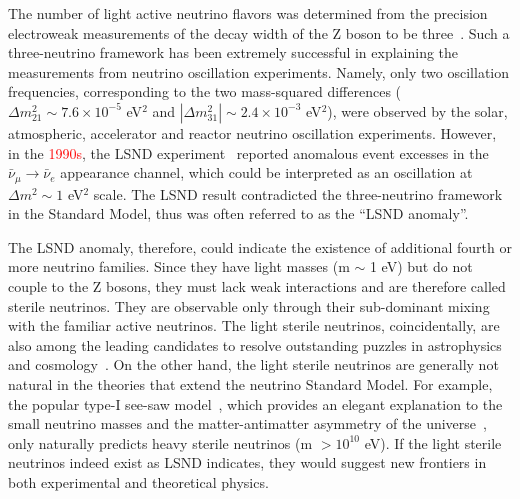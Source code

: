 \documentclass[aps,twocolumn,preprintnumbers,amsmath,superscriptaddress,amssymb,floats,nofootinbib]{revtex4-1}
\begin{document}
The number of light active neutrino flavors was determined from the precision electroweak measurements of the decay width of the Z boson to be three~\cite{EW-2005}. 
Such a three-neutrino framework has been extremely successful in explaining the measurements from neutrino oscillation experiments. 
Namely, only two oscillation frequencies, corresponding to the two mass-squared differences ($\Delta m_{21}^2\sim7.6\times10^{-5}$ eV$^2$ and $|\Delta m_{31}^2|\sim2.4\times10^{-3}$ eV$^2$), were observed by the solar, atmospheric, accelerator and reactor neutrino oscillation experiments. 
However, in the \textcolor{red}{1990s}, the LSND experiment~\cite{LSND1995,LSND2001} reported anomalous event excesses in the $\bar\nu_\mu\rightarrow\bar\nu_e$ appearance channel, which could be interpreted as an oscillation at $\Delta m^2\sim1$ eV$^2$ scale. 
The LSND result contradicted the three-neutrino framework in the Standard Model, thus was often referred to as the ``LSND anomaly''.

The LSND anomaly, therefore, could indicate the existence of additional
fourth or more neutrino families. 
Since they have light masses (m $\sim$ 1 eV) but do not couple to the Z bosons, they must lack weak interactions and are therefore called sterile neutrinos. 
They are observable only through their sub-dominant mixing with the familiar active neutrinos. 
The light sterile neutrinos, coincidentally, are also among the leading candidates to resolve outstanding puzzles in astrophysics and cosmology~\cite{Dodelson,Kusenko,Wyman,Battye}.
On the other hand, the light sterile neutrinos are generally not natural in the theories that extend the neutrino Standard Model. 
For example, the popular type-I see-saw model~\cite{Minkowski,Yanagida,GellMann,Mohapatra}, which provides an elegant explanation to the small neutrino masses and the matter-antimatter asymmetry of the universe~\cite{Fukugita}, only naturally predicts heavy sterile neutrinos (m $>10^{10}$ eV).
If the light sterile neutrinos indeed exist as LSND indicates, they would suggest new frontiers in both experimental and theoretical physics.
\end{document}
